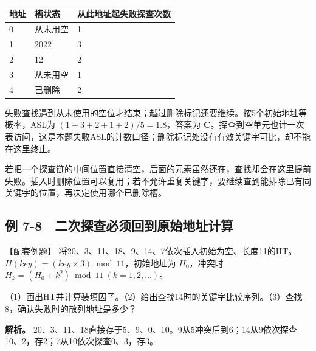 \begin{wideblock}

\par\medskip\noindent\begin{minipage}{\linewidth}\fontsize{9.3}{12}\selectfont\begin{tabularx}{\linewidth}{@{}YYY@{}}
\toprule\noalign{}
地址 & 槽状态 & 从此地址起失败探查次数 \\
\midrule\noalign{}


0 & 从未用空 & 1 \\
1 & 2022 & 3 \\
2 & 12 & 2 \\
3 & 从未用空 & 1 \\
4 & 已删除 & 2 \\
\bottomrule\end{tabularx}
\end{minipage}\par\medskip

\end{wideblock}

失败查找遇到从未使用的空位才结束；越过删除标记还要继续。按5个初始地址等概率，ASL为 \((1+3+2+1+2)/5=1.8\)，答案为 \textbf{C}。探查到空单元也计一次表访问，这是本题失败ASL的计数口径；删除标记处没有有效关键字可比，却不能在这里终止。

若把一个探查链的中间位置直接清空，后面的元素虽然还在，查找却会在这里提前失败。插入时删除位置可以复用；若不允许重复关键字，要继续查到能排除已有同关键字的位置，再决定使用哪个已删除槽。

\subsection{例 7-8　二次探查必须回到原始地址计算}\label{DS07-ex8}

\begin{example}[配套案例]

【配套例题】 将20、3、11、18、9、14、7依次插入初始为空、长度11的HT。\(H(key)=(key\times3)\bmod11\)，初始地址为 \(H_0\)，冲突时 \(H_k=(H_0+k^2)\bmod11\ (k=1,2,\ldots)\)。

（1）画出HT并计算装填因子。（2）给出查找14时的关键字比较序列。（3）查找8，确认失败时的散列地址是多少？

\end{example}

\textbf{解析。} 20、3、11、18直接存于5、9、0、10。9从5冲突后到6；14从9依次探查10、2，存2；7从10依次探查0、3，存3。

